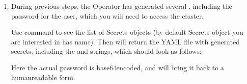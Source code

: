 \documentclass[letterpaper,10pt,english]{sphinxmanual}
\begin{document}
\begin{enumerate}
\begin{sphinxVerbatim}[commandchars=\\\{\}]
\PYGZdl{} kubectl apply \PYGZhy{}f deploy/cr.yaml
\end{sphinxVerbatim}

The process could take some time.
The return statement confirms the creation:

\begin{sphinxVerbatim}[commandchars=\\\{\}]
perconaservermongodb.psmdb.percona.com/my\PYGZhy{}cluster\PYGZhy{}name created
\end{sphinxVerbatim}

\item {} 
During previous steps, the Operator has generated several , including the password for the  user, which you will need to access the cluster.

Use  command to see the list of Secrets objects (by default Secrets object you are interested in has  name). Then  will return the YAML file with generated secrets, including the 
and  strings, which should look as follows:

\begin{sphinxVerbatim}[commandchars=\\\{\}]
   
   
\end{sphinxVerbatim}

Here the actual password is base64\sphinxhyphen{}encoded, and  will bring it back to a human\sphinxhyphen{}readable form.

\end{enumerate}
\end{document}
